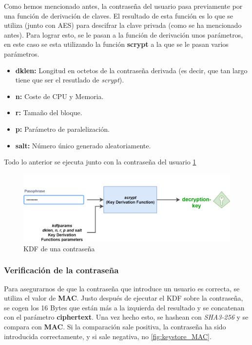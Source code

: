 Como hemos mencionado antes, la contraseña del usuario pasa previamente por una función de derivación de claves. El resultado de esta función es lo que se utiliza (junto con AES) para descifrar la clave privada (como se ha mencionado antes). Para lograr esto, se le pasan a la función de derivación unos parámetros, en este caso se esta utilizando la función \textbf{scrypt}\cite{scrypt} a la que se le pasan varios parámetros.
\begin{itemize}
\item \textbf{dklen:} Longitud en octetos de la contraseña derivada (es decir, que tan largo tiene que ser el resutlado de \emph{scrypt}).
\item \textbf{n:} Coste de CPU y Memoria.
\item \textbf{r:} Tamaño del bloque.
\item \textbf{p:} Parámetro de paralelización.
\item \textbf{salt:} Número único generado aleatoriamente.
\end{itemize}

Todo lo anterior se ejecuta junto con la contraseña del usuario \ref{fig:keystore_scrypt}

\begin{figure}[h!]
  \centering
  \includegraphics[width=0.8\linewidth]{figs/Desarrollo/Keystore/keystore_scrypt}
  \caption[KDF de una contraseña]{KDF de una contraseña}
  \label{fig:keystore_scrypt}
\end{figure}

\vspace{5cm}
\subsubsection{Verificación de la contraseña}

Para asegurarnos de que la contraseña que introduce un usuario es correcta, se utiliza el valor de \textbf{MAC}. Justo después de ejecutar el KDF sobre la contraseña, se cogen los 16 Bytes que están más a la izquierda del resultado y se concatenan con el parámetro \textbf{ciphertext}. Una vez hecho esto, se hashean con \emph{SHA3-256}\cite{sha3} y se compara con \textbf{MAC}. Si la comparación sale positiva, la contraseña ha sido introducida correctamente, y si sale negativa, no \ref{fig:keystore_MAC}.

